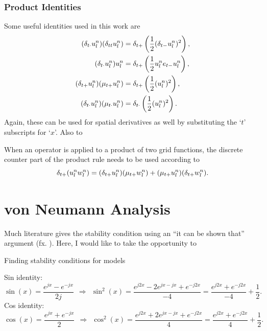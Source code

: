 \subsubsection{Product Identities}
Some useful identities used in this work are
\begin{subequations}
    \begin{align}
        (\delta_{t\cdot} u_l^n)(\delta_{tt} u_l^n) &= \delta_{t+} \left(\frac{1}{2}(\delta_{t-} u_l^n)^2\right),\label{eq:prodIdentity1}\\
        (\delta_{t\cdot} u_l^n)u_l^n &= \delta_{t+} \left(\frac{1}{2}u_l^n e_{t-}u_l^n\right),\label{eq:prodIdentity2}\\
        (\delta_{t+} u_l^n)(\mu_{t+} u_l^n) &= \delta_{t+} \left(\frac{1}{2}(u_l^n)^2\right),\label{eq:prodIdentity3}\\
        (\delta_{t\cdot} u_l^n)(\mu_{t\cdot}u_l^n) &= \delta_{t\cdot}\left(\frac{1}{2} (u_l^n)^2\right).\label{eq:prodIdentity4}
    \end{align}
\end{subequations}
Again, these can be used for spatial derivatives as well by substituting the `$t$' subscripts for `$x$'. Also  to 

When an operator is applied to a product of two grid functions, the discrete counter part of the product rule needs to be used according to
\begin{equation}
    \delta_{t+} (u_l^nw_l^n) = (\delta_{t+} u_l^n)(\mu_{t+}w_l^n) + (\mu_{t+} u_l^n)(\delta_{t+} w_l^n).
\end{equation}
\section{von Neumann Analysis}\label{sec:stabilityAnalysis}
Much literature gives the stability condition using an ``it can be shown that'' argument (fx. \cite{Bilbao2009}). Here, I would like to take the opportunity to 

Finding stability conditions for models

Sin identity:
\begin{equation}\label{eq:sinIdentity}
    \sin(x) = \frac{e^{jx} - e^{-jx}}{2j}\ \ \Rightarrow \ \ \sin^2(x) = \frac{e^{j2x} - 2e^{jx-jx}+ e^{-j2x}}{-4} = \frac{e^{j2x} + e^{-j2x}}{-4} + \frac{1}{2}.
\end{equation}
Cos identity:
\begin{equation}\label{eq:cosIdentity}
    \cos(x) = \frac{e^{jx} + e^{-jx}}{2}\ \ \Rightarrow \ \ \cos^2(x) = \frac{e^{j2x} + 2e^{jx-jx}+ e^{-j2x}}{4} = \frac{e^{j2x} + e^{-j2x}}{4} + \frac{1}{2}.
\end{equation}

